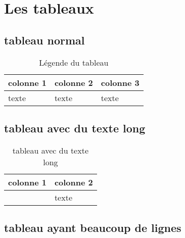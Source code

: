 
\section{Les tableaux}


\subsection{tableau normal}

\begin{table}[H]
	
	\centering
	\caption{Légende du tableau}	
	\label{tab:label_tableau}
	
	\begin{tabular}{|l|l|l|}
		\hline \bf colonne 1 & \bf colonne 2 & \bf colonne 3 \\
		
		\hline texte & texte & texte \\
		\hline 
		
	\end{tabular}
	
\end{table}


\subsection{tableau avec du texte long}

\begin{table}[H]
	
	\centering
	\caption{tableau avec du texte long}	
	\label{tab:label_tableau_texte_long}
	
	\begin{tabular}{|p{12cm}|p{3cm}|}
		\hline \bf colonne 1 & \bf colonne 2 \tabularnewline
		
		\hline 
			\raggedright \lipsum[1] & 
			\centering texte 
			\tabularnewline
		\hline 
		
	\end{tabular}
	
\end{table}


\subsection{tableau ayant beaucoup de lignes}




